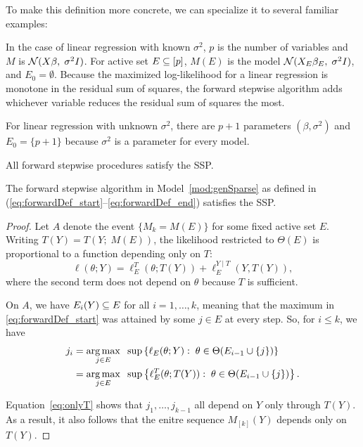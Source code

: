 \documentclass{article}
\begin{document}
To make this definition more concrete, we can specialize it to several familiar examples:

\begin{example}
In the case of linear regression with known $\sigma^2$, $p$ is the number of variables and $M$ is $\mathcal{N}(X\beta, \;\sigma^2I)$. For active set $E \subseteq [p]$, $M(E)$ is the model $\mathcal{N}(X_E\beta_E, \;\sigma^2I)$, and $E_0 = \emptyset$. Because the maximized log-likelihood for a linear regression is monotone in the residual sum of squares, the forward stepwise algorithm adds whichever variable reduces the residual sum of squares the most.

For linear regression with unknown $\sigma^2$, there are $p+1$ parameters $(\beta, \sigma^2)$ and $E_0 = \{p+1\}$ because $\sigma^2$ is a parameter for every model.
\end{example}

\begin{example}
\end{example}

All forward stepwise procedures satisfy the SSP.

\begin{proposition}\label{prop:forwardSSP}
  The forward stepwise algorithm in Model~\ref{mod:genSparse} as defined in (\ref{eq:forwardDef_start}--\ref{eq:forwardDef_end}) satisfies the SSP.
\end{proposition}
\begin{proof}
  Let $A$ denote the event $\{M_k = M(E)\}$ for some fixed active set $E$. Writing $T(Y) = T(Y; \;M(E))$, the likelihood restricted to $\Theta(E)$ is proportional to a function depending only on $T$:
\[
\ell(\theta; Y) = \ell_E^T(\theta; T(Y)) + \ell_E^{Y \mid T}(Y, T(Y)),
\]
where the second term does not depend on $\theta$ because $T$ is sufficient.

On $A$, we have $E_i(Y) \subseteq E$ for all $i=1,\ldots, k$, meaning that the maximum in \eqref{eq:forwardDef_start} was attained by some $j\in E$ at every step. So, for $i \leq k$, we have
\begin{align}
  j_i &= \operatorname*{arg\,max}_{j\in E} \;\;\sup \left\{\ell_E(\theta; Y):\;
    \theta\in\Theta(E_{i-1} \cup \{j\})\right\} \\
  &= \operatorname*{arg\,max}_{j\in E} \;\;\sup \left\{\ell_E^T(\theta; T(Y)):\;
    \theta\in\Theta(E_{i-1} \cup \{j\})\right\}. \label{eq:onlyT}
\end{align}

Equation~\eqref{eq:onlyT} shows that $j_1,\ldots, j_{k-1}$ all depend on $Y$ only through $T(Y)$. As a result, it also follows that the enitre sequence $M_{[k]}(Y)$ depends only on $T(Y)$.
\end{proof}
\end{document}
